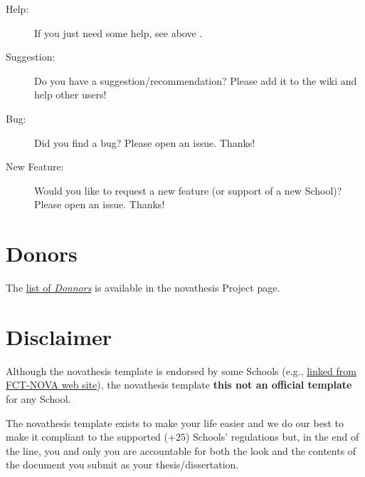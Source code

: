 \begin{description}
  \item[Help:] If you just need some help, see above .
  \item[Suggestion:] \ntindex[Suggestions]{} Do you have a suggestion/recommendation? Please add it to the wiki and help other users!
  \item[Bug:] \ntindex[Bugs]{} Did you find a bug? Please open an issue. Thanks!
  \item[New Feature:]  Would you like to request a new feature (or support of a new School)? Please open an issue. Thanks!

\end{description}







\section{Donors}
\label{sec:donations}

\ntindex[Donations]{}

The \href{https://github.com/joaomlourenco/novathesis/wiki#donators}{list of \emph{Donnors}} is available in the \gls{novathesis} Project page.


\section{Disclaimer}
\label{sec:disclaimer}

\ntindex[Disclaimer]{}

Although the \gls{novathesis} template is endorsed by some Schools (e.g., \href{https://www.fct.unl.pt/estudante/informacao-academica/teses-e-dissertacoes}{linked from FCT-NOVA web site}), the \gls{novathesis} template \textbf{this not an official template} for any School.

The \gls{novathesis} template exists to make your life easier and we do our best to make it compliant to the supported ($+25$) Schools' regulations but, in the end of the line, you and only you are accountable for both the look and the contents of the document you submit as your thesis/dissertation.
